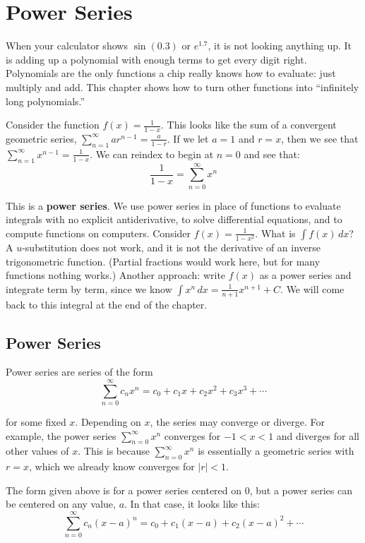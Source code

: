 \chapter{Power Series}

When your calculator shows $\sin(0.3)$ or $e^{1.7}$, it is not looking anything up.
It is adding up a polynomial with enough terms to get every digit right.
Polynomials are the only functions a chip really knows how to evaluate: just
multiply and add. This chapter shows how to turn other functions into
``infinitely long polynomials.''

Consider the function $f(x) = \frac{1}{1-x}$. This looks like the sum of a
convergent geometric series, $\sum_{n=1}^\infty ar^{n-1} = \frac{a}{1-r}$. 
If we let $a = 1$ and $r = x$, then we see that $\sum_{n=1}^\infty x^{n-1} = 
\frac{1}{1-x}$. We can reindex to begin at $n=0$ and see that:
$$\frac{1}{1-x} = \sum_{n=0}^\infty x^n$$

This is a \textbf{power series}. We use power series in place of functions to
evaluate integrals with no explicit antiderivative, to solve differential
equations, and to compute functions on computers. Consider $f(x) = \frac{1}{1-x^2}$. What is $\int 
f(x)\,dx$? A $u$-substitution does not work, and it is not the derivative of an inverse
trigonometric function. (Partial fractions would work here, but for many
functions nothing works.) Another approach: write $f(x)$ as a power series and
integrate term by term, since we know $\int x^n\,dx = \frac{1}{n+1}x^{n+1} + C$.
We will come back to this integral at the end of the chapter.

\section{Power Series}
Power series are series of the form
$$\sum_{n=0}^\infty c_n x^n = c_0 + c_1 x + c_2 x^2 + c_3 x^3 + \cdots$$

for some fixed $x$. Depending on $x$, the series may converge or diverge. For 
example, the power series $\sum_{n=0}^\infty x^n$ converges for $ -1 < x < 1$ 
and diverges for all other values of $x$. This is because $\sum_{n=0}^\infty 
x^n$ is essentially a geometric series with $r = x$, which we already know 
converges for $|r|<1$. 

The form given above is for a power series centered on $0$, but a power series 
can be centered on any value, $a$. In that case, it looks like this:
$$\sum_{n=0}^\infty c_n (x - a)^n = c_0 + c_1(x - a) + c_2(x - a)^2 + \cdots$$

